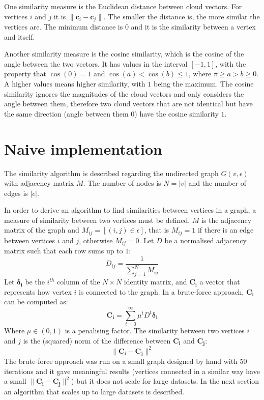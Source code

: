 \documentclass[12pt]{report}
\begin{document}
One similarity measure is the Euclidean distance between cloud vectors. For
vertices $i$ and $j$ it is $\|\bm{c}_i - \bm{c}_j\|$. The smaller the distance
is, the more similar the vertices are. The minimum distance is $0$ and it is the
similarity between a vertex and itself.

Another similarity measure is the cosine similarity, which is the cosine of the
angle between the two vectors. It has values in the interval $[-1,1]$, with the
property that $\cos(0) = 1$ and $\cos(a) < \cos(b) \leq 1$, where $\pi \geq a > b
\geq 0$. A higher values means higher similarity, with $1$ being the maximum. The
cosine similarity ignores the magnitudes of the cloud vectors and only considers
the angle between them, therefore two cloud vectors that are not identical but
have the same direction (angle between them $0$) have the cosine similarity $1$.

%
%
\section{Naive implementation}
%
The similarity algorithm is described regarding the undirected graph $G(v, \epsilon)$
with adjacency matrix $M$. The number of nodes is $N = |v|$ and the number of
edges is $|\epsilon|$.


In order to derive an algorithm to find similarities between vertices in a graph,
a measure of similarity between two vertices must be defined. $M$ is the adjacency
matrix of the graph and $M_{i j} = [(i,j) \in \epsilon]$, that is $M_{i j} = 1$
if there is an edge between vertices $i$ and $j$, otherwise $M_{i j} = 0$. Let
$D$ be a normalised adjacency matrix such that each row sums up to $1$:
%
\begin{equation}
D_{i j} = \frac{1}{\sum_{j=1}^N M_{ij}}
\end{equation}
%
Let $\mathbf{\delta_i}$ be the $i^{th}$ column of the $N \times N$ identity matrix,
and $\mathbf{C_i}$ a vector that represents how vertex $i$ is connected to the graph.
In a brute-force approach, $\mathbf{C_i}$ can be computed as:
%
\begin{equation}
\label{eq:brute-ci}
\mathbf{C_i} = \sum_{t=0}^\infty \mu^t D^t \mathbf{\delta_i}
\end{equation}
%
Where $\mu \in (0,1)$ is a penalising factor. The similarity between two vertices
$i$ and $j$ is the (squared) norm of the difference between $\mathbf{C_i}$ and
$\mathbf{C_j}$:
%
\begin{equation}
\|\mathbf{C_i} - \mathbf{C_j}\|^2
\end{equation}
%
The brute-force approach was run on a small graph designed by hand with 50 iterations
and it gave meaningful results (vertices connected in a similar way have a small
$\|\mathbf{C_i} - \mathbf{C_j}\|^2$) but it does not scale for large datasets. In
the next section an algorithm that scales up to large datasets is described.
\end{document}
